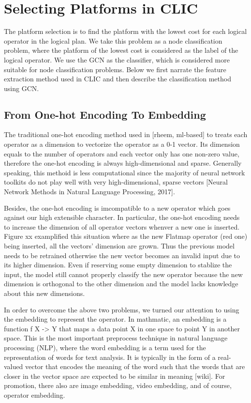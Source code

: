 
\section{Selecting Platforms in CLIC}
The platform selection is to find the platform with the lowest cost for each logical operator in the logical plan. We take this problem as a node classification problem, where the platform of the lowest cost is considered as the label of the logical operator. We use the GCN as the classifier, which is considered more suitable for node classification problems. Below we first narrate the feature extraction method used in CLIC and then describe the classification method using GCN.

\subsection{From One-hot Encoding To Embedding}
The traditional one-hot encoding method used in [rheem, ml-based] to treats each operator as a dimension to vectorize the operator as a 0-1 vector. 
Its dimension equals to the number of operators and each vector only has one non-zero value, therefore the one-hot encoding is always high-dimensional and sparse. 
Generally speaking, this methoid is less computational since the majority of neural network toolkits do not play well with very high-dimensional, sparse vectors [Neural Network Methods in Natural Language Processing, 2017].

Besides, the one-hot encoding is imcompatible to a new operator which goes against our high extensible character. 
In particular, the one-hot encoding needs to increase the dimension of all operator vectors whenver a new one is inserted. 
Figure xx examplified this situation where as the new Flatmap operator (red one) being inserted, all the vectors' dimension are grown. 
Thus the previous model needs to be retrained otherwise the new vector becomes an invalid input due to its higher dimension. 
Even if reserving some empty dimension to stablize the input, the model still cannot properly classify the new operator because the new dimension is orthogonal to the other dimension and the model lacks knowledge about this new dimensions.

In order to overcome the above two problems, we turned our attention to using the embedding to represent the operator. 
In mathmatic, an embedding is a function f X -> Y that maps a data point X in one space to point Y in another space. 
This is the most important preprocess technique in natural language processing (NLP), where the word embedding is a term used for the representation of words for text analysis. 
It is typically in the form of a real-valued vector that encodes the meaning of the word such that the words that are closer in the vector space are expected to be similar in meaning [wiki]. 
For promotion, there also are image embedding, video embedding, and of course, operator embedding. 

